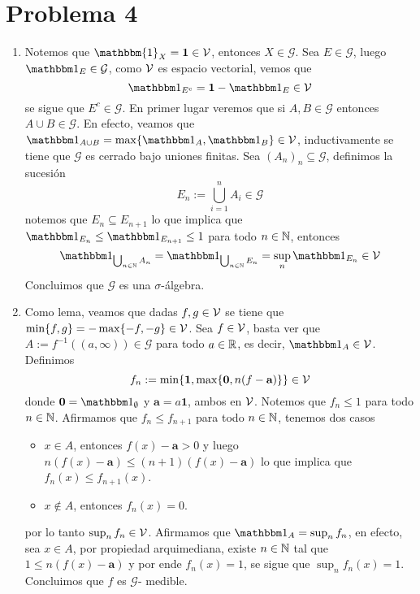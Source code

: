 \documentclass{article}
\begin{document}
\section*{Problema 4}
\begin{enumerate}
    \item Notemos que $\mathbbm{1}_{X}=\textbf{1}\in\V$, entonces $X\in\mathcal{G}$. Sea 
    $E\in\mathcal{G}$, luego $\I_{E}\in\mathcal{G}$, como $\mathcal{V}$ es espacio vectorial, vemos que
    \begin{equation*}
        \I_{E^{c}}=\textbf{1}-\I_{E}\in\V
    \end{equation*}
    se sigue que $E^{c}\in\mathcal{G}$. En primer lugar veremos que si $A,B\in\mathcal{G}$ entonces
    $A\cup B\in\mathcal{G}$. En efecto, veamos que $\I_{A\cup B}=\max\{\I_{A},\I_{B}\}\in\V$,
    inductivamente se tiene que $\mathcal{G}$ es cerrado bajo uniones finitas. Sea $(A_{n})_{n}
    \subseteq\mathcal{G}$, definimos la sucesión
    \begin{equation*}
        E_{n}:=\bigcup_{i=1}^{n}A_{i}\in\mathcal{G}
    \end{equation*}
    notemos que $E_{n}\subseteq E_{n+1}$ lo que implica que $\I_{E_{n}}\leq\I_{E_{n+1}}\leq1$ para
    todo $n\in\mathbb{N}$, entonces
    \begin{equation*}
        \I_{\bigcup_{n\in\N}A_{n}}=\I_{\bigcup_{n\in\N}E_{n}}=\sup_{n}\I_{E_{n}}\in\V
    \end{equation*}
    Concluimos que $\mathcal{G}$ es una $\sigma$-álgebra.

    \item Como lema, veamos que dadas $f,g\in\mathcal{V}$ se tiene que $\min\{f,g\}=-\max\{-f,-g\}\in\mathcal{V}$. 
    Sea $f\in\mathcal{V}$, basta ver que $A:=f^{-1}((a,\infty))\in\mathcal{G}$ para todo $a\in\mathbb{R}$, es decir,
    $\I_{A}\in\V$. Definimos
    \begin{equation*}
        f_{n}:=\min\{\textbf{1},\max\{\textbf{0},n(f-\textbf{a})\}\}\in\mathcal{V}
    \end{equation*}
    donde $\textbf{0}=\I_{\emptyset}$ y $\textbf{a}=a\textbf{1}$, ambos en $\mathcal{V}$. Notemos que 
    $f_{n}\leq1$ para todo $n\in\mathbb{N}$. Afirmamos que $f_{n}\leq f_{n+1}$ para todo $n\in\mathbb{N}$, tenemos
    dos casos
    \begin{itemize}
        \item $x\in A$, entonces $f(x)-\textbf{a}>0$ y luego $n(f(x)-\textbf{a})\leq(n+1)
        (f(x)-\textbf{a})$ lo que implica que $f_{n}(x)\leq f_{n+1}(x)$.

        \item $x\not\in A$, entonces $f_{n}(x)=0$.
    \end{itemize}
    por lo tanto $\sup_{n}f_{n}\in\mathcal{V}$. Afirmamos que $\I_{A}=\sup_{n}f_{n}$, en efecto, sea 
    $x\in A$, por propiedad arquimediana, existe $n\in\mathbb{N}$ tal que $1\leq n(f(x)-\textbf{a})$ y por
    ende $f_{n}(x)=1$, se sigue que $\sup_{n}f_{n}(x)=1$. Concluimos que $f$ es $\mathcal{G}$-
    medible.


\end{enumerate}
\end{document}
